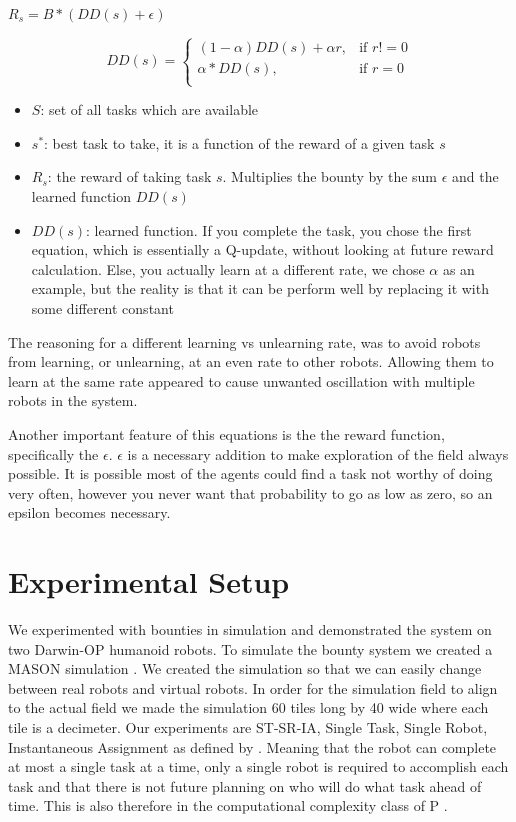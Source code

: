 \documentclass[twocolumn]{article}
\begin{document}
$R_s=B*(DD(s)+\epsilon)$

\[ DD(s) = 
\begin{cases}
     (1-\alpha)DD(s)+ \alpha r,& \text{if } r!=0\\
     \alpha*DD(s),& \text{if } r=0\\

\end{cases}
\]

\begin{itemize}
\item $S$: set of all tasks which are available
\item $s^*$:  best task to take, it is a function of the reward of a given task $s$
\item $R_s$: the reward of taking task $s$. Multiplies the bounty by the sum $\epsilon$ and the learned function $DD(s)$
\item $DD(s)$:  learned function. If you complete the task, you chose the first equation, which is essentially a Q-update, without looking at future reward calculation. Else, you actually learn at a different rate, we chose $\alpha$ as an example, but the reality is that it can be perform well by replacing it with some different constant


\end{itemize}
The reasoning for a different learning vs unlearning rate, was to avoid robots from learning, or unlearning, at an even rate to other robots. Allowing them to learn at the same rate appeared to cause unwanted oscillation with multiple robots in the system. 

Another important feature of this equations is the the reward function, specifically the $\epsilon$. $\epsilon$ is a necessary addition to make exploration of the field always possible. It is possible most of the agents could find a task not worthy of doing very often, however you never want that probability to go as low as zero, so an epsilon becomes necessary.
\section{Experimental Setup}

We experimented with bounties in simulation and demonstrated the system on two Darwin-OP humanoid robots.  To simulate the bounty system we created a MASON simulation \cite{Luke2003}.  We created the simulation so that we can easily change between real robots and virtual robots.  In order for the simulation field to align to the actual field we made the simulation 60 tiles long by 40 wide where each tile is a decimeter.  Our experiments are ST-SR-IA, Single Task, Single Robot, Instantaneous Assignment as defined by \cite{Gerkey2004}.  Meaning that the robot can complete at most a single task at a time, only a single robot is required to accomplish each task and that there is not future planning on who will do what task ahead of time.  This is also therefore in the computational complexity class of P \cite{Campbell2010, Gerkey2003}.
\end{document}
